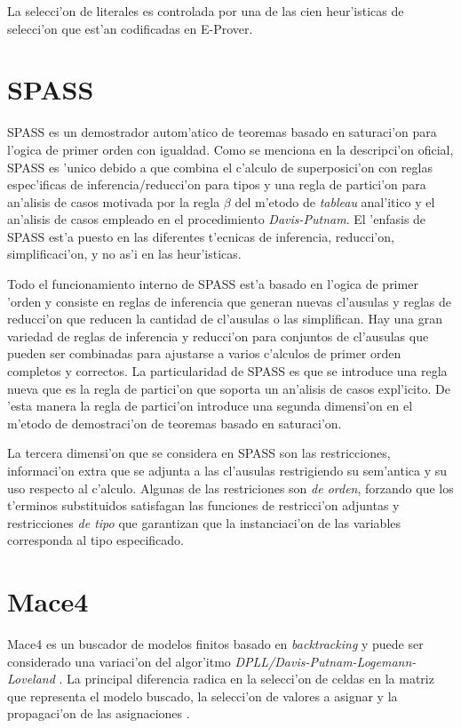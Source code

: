 La selecci'on de literales es controlada por una de las cien heur'isticas de selecci'on que est'an codificadas en E-Prover.



\section{SPASS}

SPASS es un demostrador autom'atico de teoremas basado en saturaci'on para l'ogica de primer orden con igualdad. Como se menciona en la descripci'on oficial, SPASS es 'unico debido a que combina el c'alculo de superposici'on con reglas espec'ificas de inferencia/reducci'on para tipos y una regla de partici'on para an'alisis de casos motivada por la regla $\beta$ del m'etodo de \textit{tableau} anal'itico y el an'alisis de casos empleado en el procedimiento \textit{Davis-Putnam}. El 'enfasis de SPASS est'a puesto en las diferentes t'ecnicas de inferencia, reducci'on, simplificaci'on, y no as'i en las heur'isticas.

Todo el funcionamiento interno de SPASS est'a basado en l'ogica de primer 'orden y consiste en reglas de inferencia que generan nuevas cl'ausulas y reglas de reducci'on que reducen la cantidad de cl'ausulas o las simplifican. Hay una gran variedad de reglas de inferencia y reducci'on para conjuntos de cl'ausulas que pueden ser combinadas para ajustarse a varios c'alculos de primer orden completos y correctos. La particularidad de SPASS es que se introduce una regla nueva que es la regla de partici'on que soporta un an'alisis de casos expl'icito. De 'esta manera la regla de partici'on introduce una segunda dimensi'on en el m'etodo de demostraci'on de teoremas basado en saturaci'on.

La tercera dimensi'on que se considera en SPASS son las restricciones, informaci'on extra que se adjunta a las cl'ausulas restrigiendo su sem'antica y su uso respecto al c'alculo. Algunas de las restriciones son \textit{de orden}, forzando que los t'erminos substituidos satisfagan las funciones de restricci'on adjuntas y restricciones \textit{de tipo} que garantizan que la instanciaci'on de las variables corresponda al tipo especificado.


\section{Mace4}

Mace4 es un buscador de modelos finitos basado en \textit{backtracking} y puede ser considerado una variaci'on del algor'itmo \textit{DPLL/Davis-Putnam-Logemann-Loveland} \cite{dpll}. La principal diferencia radica en la selecci'on de celdas en la matriz que representa el modelo buscado, la selecci'on de valores a asignar y la propagaci'on de las asignaciones \cite{mace4_manual}.

